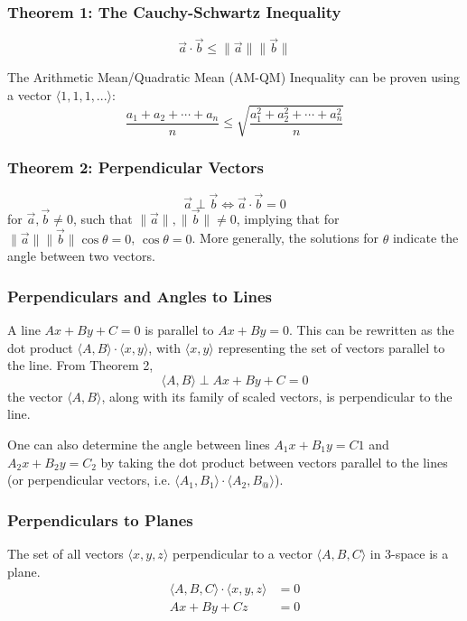 \documentclass{article}
\newcommand{\vect}[1]{\ensuremath{\overrightarrow{#1}}}
\newcommand{\magnitude}[1]{\ensuremath{\lVert #1 \rVert}}
\newcommand{\magvect}[1]{\magnitude{\vect{#1}}}
\begin{document}
\subsubsection{Theorem 1: The Cauchy-Schwartz Inequality}
$$\vect{a} \cdot \vect{b} \le \magvect{a}\magvect{b}$$

The Arithmetic Mean/Quadratic Mean (AM-QM) Inequality can be proven using a vector $\langle1, 1, 1, ...\rangle$:
$$\frac{a_1 + a_2 + \cdots + a_n}{n} \le \sqrt{\frac{a_1^2 + a_2^2 + \cdots + a_n^2}{n}}$$

\subsubsection{Theorem 2: Perpendicular Vectors}
$$\vect{a} \perp \vect{b} \iff \vect{a} \cdot \vect{b} = 0$$ for $\vect{a}, \vect{b} \ne 0$, such that $\magvect{a}, \magvect{b} \ne 0$, implying that for $\magvect{a}\magvect{b}\cos{\theta} = 0$, $\cos{\theta} = 0$. More generally, the solutions for $\theta$ indicate the angle between two vectors.

\subsubsection{Perpendiculars and Angles to Lines}
A line $Ax + By + C = 0$ is parallel to $Ax + By = 0$. This can be rewritten as the dot product $\langle A, B \rangle \cdot \langle x, y \rangle$, with $\langle x, y \rangle$ representing the set of vectors parallel to the line. From Theorem 2,
$$\langle A, B \rangle \perp Ax + By + C = 0$$
the vector $\langle A, B \rangle$, along with its family of scaled vectors, is perpendicular to the line.

One can also determine the angle between lines $A_1x + B_1y = C1$ and $A_2x + B_2y = C_2$ by taking the dot product between vectors parallel to the lines (or perpendicular vectors, i.e. $\langle A_1, B_1 \rangle \cdot \langle A_2, B_@ \rangle$).

\subsubsection{Perpendiculars to Planes}
The set of all vectors $\langle x, y, z \rangle$ perpendicular to a vector $\langle A, B, C \rangle$ in 3-space is a plane.
\begin{align*}
    \langle A, B, C \rangle \cdot \langle x, y, z \rangle &= 0 \\
    Ax + By + Cz &= 0
\end{align*}
\end{document}
